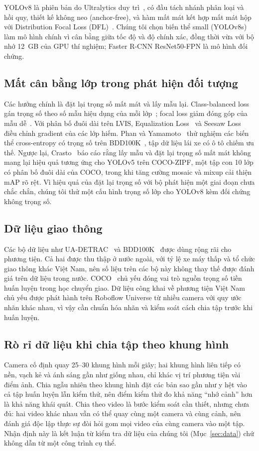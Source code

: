 \documentclass[10pt,journal,a4paper]{IEEEtran}
\begin{document}
YOLOv8 là phiên bản do Ultralytics duy trì~\cite{ultra}, có đầu tách nhánh phân loại và hồi quy, thiết kế không neo (anchor-free), và hàm mất mát kết hợp mất mát hộp với Distribution Focal Loss (DFL)~\cite{gfl}. Chúng tôi chọn biến thể small (YOLOv8s) làm mô hình chính vì cân bằng giữa tốc độ và độ chính xác, đồng thời vừa với bộ nhớ 12~GB của GPU thí nghiệm; Faster R-CNN ResNet50-FPN là mô hình đối chứng.

\subsection{Mất cân bằng lớp trong phát hiện đối tượng}
Các hướng chính là đặt lại trọng số mất mát và lấy mẫu lại. Class-balanced loss gán trọng số theo số mẫu hiệu dụng của mỗi lớp~\cite{cbloss}; focal loss giảm đóng góp của mẫu dễ~\cite{focal}. Với phân bố đuôi dài trên LVIS, Equalization Loss~\cite{eql} và Seesaw Loss~\cite{seesaw} điều chỉnh gradient của các lớp hiếm. Phan và Yamamoto~\cite{phan} thử nghiệm các biến thể cross-entropy có trọng số trên BDD100K~\cite{bdd}, tập dữ liệu lái xe có ô tô chiếm ưu thế. Ngược lại, Crasto~\cite{crasto} báo cáo rằng lấy mẫu và đặt lại trọng số mất mát không mang lại hiệu quả tương ứng cho YOLOv5 trên COCO-ZIPF, một tập con 10 lớp có phân bố đuôi dài của COCO, trong khi tăng cường mosaic và mixup cải thiện mAP rõ rệt. Vì hiệu quả của đặt lại trọng số với bộ phát hiện một giai đoạn chưa chắc chắn, chúng tôi thử một cấu hình trọng số lớp cho YOLOv8 kèm đối chứng không trọng số.

\subsection{Dữ liệu giao thông}
Các bộ dữ liệu như UA-DETRAC~\cite{detrac} và BDD100K~\cite{bdd} được dùng rộng rãi cho phương tiện. Cả hai được thu thập ở nước ngoài, với tỷ lệ xe máy thấp và tổ chức giao thông khác Việt Nam, nên số liệu trên các bộ này không thay thế được đánh giá trên dữ liệu trong nước. COCO~\cite{coco} chủ yếu đóng vai trò nguồn trọng số tiền huấn luyện trong học chuyển giao. Dữ liệu công khai về phương tiện Việt Nam chủ yếu được phát hành trên Roboflow Universe từ nhiều camera với quy ước nhãn khác nhau, vì vậy cần chuẩn hóa nhãn và kiểm soát cách chia tập trước khi huấn luyện.

\subsection{Rò rỉ dữ liệu khi chia tập theo khung hình}
Camera cố định quay 25--30 khung hình mỗi giây; hai khung hình liên tiếp có nền, vạch kẻ và ánh sáng gần như giống nhau, chỉ khác vị trí phương tiện vài điểm ảnh. Chia ngẫu nhiên theo khung hình đặt các bản sao gần như y hệt vào cả tập huấn luyện lẫn kiểm thử, nên điểm kiểm thử đo khả năng ``nhớ cảnh'' hơn là khả năng khái quát. Chia theo video là bước kiểm soát cần thiết, nhưng chưa đủ: hai video khác nhau vẫn có thể quay cùng một camera và cùng cảnh, nên đánh giá độc lập thực sự đòi hỏi gom mọi video của cùng camera vào một tập. Nhận định này là kết luận từ kiểm tra dữ liệu của chúng tôi (Mục~\ref{sec:data}) chứ không dẫn từ một công trình cụ thể.
\end{document}
